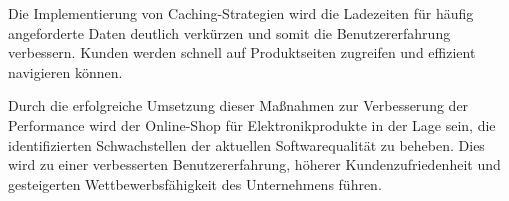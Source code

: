 Die Implementierung von Caching-Strategien wird die Ladezeiten für häufig angeforderte Daten deutlich verkürzen und somit die Benutzererfahrung verbessern. Kunden werden schnell auf Produktseiten zugreifen und effizient navigieren können.

Durch die erfolgreiche Umsetzung dieser Maßnahmen zur Verbesserung der Performance wird der Online-Shop für Elektronikprodukte in der Lage sein, die identifizierten Schwachstellen der aktuellen Softwarequalität zu beheben. Dies wird zu einer verbesserten Benutzererfahrung, höherer Kundenzufriedenheit und gesteigerten Wettbewerbsfähigkeit des Unternehmens führen.